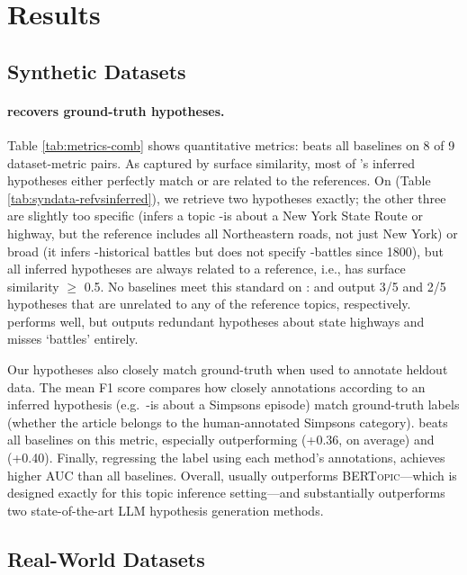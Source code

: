 \section{Results}
\label{sec:results}


\subsection{Synthetic Datasets}


\paragraph{\ourmethod recovers ground-truth hypotheses.} 
Table \ref{tab:metrics-comb} shows quantitative metrics: \ourmethod beats all baselines on 8 of 9 dataset-metric pairs. 
As captured by surface similarity, most of \ourmethod's inferred hypotheses either perfectly match or are related to the references.
On  (Table \ref{tab:syndata-refvsinferred}), we retrieve two hypotheses exactly; the other three are slightly too specific (\ourmethod infers a topic \hyp{is about a New York State Route or highway}, but the reference includes all Northeastern roads, not just New York) or broad (it infers \hyp{historical battles} but does not specify \hyp{battles since 1800}), but all inferred hypotheses are always related to a reference, i.e., has surface similarity $\ge$ 0.5. 
No baselines meet this standard on : \nlparam and \hypogenic output 3/5 and 2/5 hypotheses that are unrelated to any of the reference topics, respectively. 
\bertopic performs well, but outputs redundant hypotheses about state highways and misses `battles' entirely.

Our hypotheses also closely match ground-truth when used to annotate heldout data.
The mean F1 score compares how closely annotations according to an inferred hypothesis (e.g.~\hyp{is about a Simpsons episode}) match ground-truth labels (whether the \wiki article belongs to the human-annotated Simpsons category). 
\ourmethod beats all baselines on this metric, especially outperforming \nlparam (+0.36, on average) and \hypogenic (+0.40).
Finally, regressing the label using each method's annotations, \ourmethod achieves higher AUC than all baselines.
Overall, \ourmethod usually outperforms \textsc{BERTopic}—which is designed exactly for this topic inference setting—and substantially outperforms two state-of-the-art LLM hypothesis generation methods.


\subsection{Real-World Datasets}

